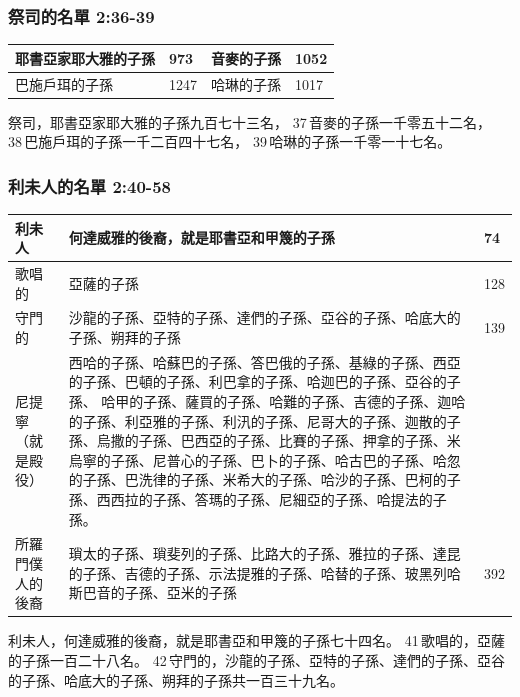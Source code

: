 \subsubsection{祭司的名單 2:36-39}
\begin{table}[H]
\centering 
\begin{tabular}{|p{4cm}|p{1cm}|p{4cm}|p{1cm}|}
\hline
\hline
耶書亞家耶大雅的子孫&973 &音麥的子孫&1052 \\\hline
巴施戶珥的子孫&1247&哈琳的子孫&1017\\\hline
\end{tabular}
\end{table}
祭司，耶書亞家耶大雅的子孫九百七十三名， 37 音麥的子孫一千零五十二名， 38 巴施戶珥的子孫一千二百四十七名， 39 哈琳的子孫一千零一十七名。

\subsubsection{利未人的名單 2:40-58}
\begin{table}[H]
\centering 
\begin{tabular}{p{4cm}|p{10cm}|p{1cm}}
\hline
\hline
利未人&何達威雅的後裔，就是耶書亞和甲篾的子孫&74 \\\hline
歌唱的&亞薩的子孫&128\\\hline
守門的&沙龍的子孫、亞特的子孫、達們的子孫、亞谷的子孫、哈底大的子孫、朔拜的子孫&139\\\hline
尼提寧（就是殿役）& 西哈的子孫、哈蘇巴的子孫、答巴俄的子孫、基綠的子孫、西亞的子孫、巴頓的子孫、利巴拿的子孫、哈迦巴的子孫、亞谷的子孫、 哈甲的子孫、薩買的子孫、哈難的子孫、吉德的子孫、迦哈的子孫、利亞雅的子孫、利汛的子孫、尼哥大的子孫、迦散的子孫、烏撒的子孫、巴西亞的子孫、比賽的子孫、押拿的子孫、米烏寧的子孫、尼普心的子孫、巴卜的子孫、哈古巴的子孫、哈忽的子孫、巴洗律的子孫、米希大的子孫、哈沙的子孫、巴柯的子孫、西西拉的子孫、答瑪的子孫、尼細亞的子孫、哈提法的子孫。&\\\hline
所羅門僕人的後裔& 瑣太的子孫、瑣斐列的子孫、比路大的子孫、雅拉的子孫、達昆的子孫、吉德的子孫、示法提雅的子孫、哈替的子孫、玻黑列哈斯巴音的子孫、亞米的子孫&392\\\hline
\end{tabular}
\end{table}
利未人，何達威雅的後裔，就是耶書亞和甲篾的子孫七十四名。 41 歌唱的，亞薩的子孫一百二十八名。 42 守門的，沙龍的子孫、亞特的子孫、達們的子孫、亞谷的子孫、哈底大的子孫、朔拜的子孫共一百三十九名。

